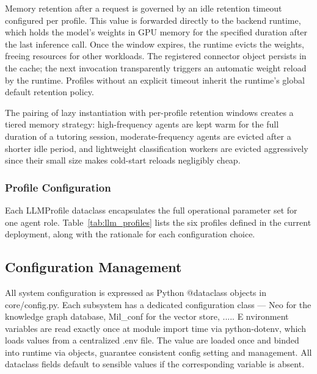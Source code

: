 Memory retention after a request is governed by an idle retention timeout
configured per profile. This value is forwarded directly to the backend runtime,
which holds the model's weights in GPU memory for the specified duration after the last
inference call. Once the window expires, the runtime evicts the weights, freeing
resources for other workloads. The registered connector object persists in the cache;
the next invocation transparently triggers an automatic weight reload by the runtime.
Profiles without an explicit timeout inherit the runtime's global default retention policy.

The pairing of lazy instantiation with per-profile retention windows creates a tiered
memory strategy: high-frequency agents are kept warm for the full
duration of a tutoring session, moderate-frequency agents are
evicted after a shorter idle period, and lightweight classification workers
are evicted aggressively since their small size makes
cold-start reloads negligibly cheap.

\subsubsection*{Profile Configuration}

Each  {LLMProfile} dataclass encapsulates the full operational parameter set for
one agent role. Table~\ref{tab:llm_profiles} lists the six profiles defined in the
current deployment, along with the rationale for each configuration choice.



\subsection{Configuration Management}

All system configuration is expressed as Python  {@dataclass} objects in  {core/config.py}. Each subsystem has a dedicated configuration class —  {Neo} for the knowledge graph database,  {Mil\_conf} for the vector store,  ..... E
nvironment variables are read exactly once at module import time via  {python-dotenv}, which loads values from a centralized  {.env} file. The value are loaded once and 
binded into runtime via objects, guarantee consistent config setting and management. All dataclass fields default to sensible values if the corresponding variable is absent.



